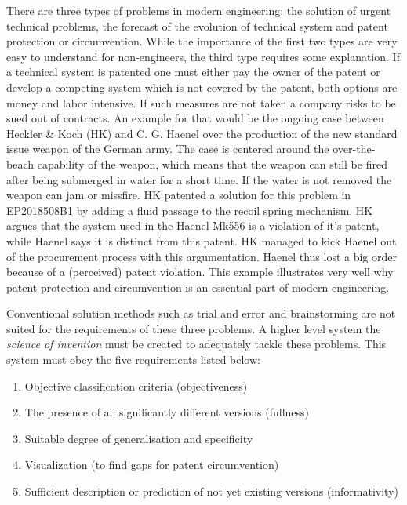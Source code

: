 \documentclass[11pt,a4paper]{article}
\begin{document}
There are three types of problems in modern engineering: the solution of urgent technical problems, the forecast of the evolution of technical system and patent protection or circumvention. While the importance of the first two types are very easy to understand for non-engineers, the third type requires some explanation. If a technical system is patented one must either pay the owner of the patent or develop a competing system which is not covered by the patent, both options are money and labor intensive. If such measures are not taken a company risks to be sued out of contracts. 
An example for that would be the ongoing case between Heckler \& Koch (HK) and C. G. Haenel over the production of the new standard issue weapon of the German army. The case is centered around the over-the-beach capability of the weapon, which means that the weapon can still be fired after being submerged in water for a short time. If the water is not removed the weapon can jam or missfire. HK patented a solution for this problem in \href{https://patents.google.com/patent/EP2018508B1/en}{EP2018508B1} by adding a fluid passage to the recoil spring mechanism. HK argues that the system used in the Haenel Mk556 is a violation of it's patent, while Haenel says it is distinct from this patent. HK managed to kick Haenel out of the procurement process with this argumentation. Haenel thus lost a big order because of a (perceived) patent violation. This example illustrates very well why patent protection and circumvention is an essential part of modern engineering.

Conventional solution methods such as trial and error and brainstorming are not suited for the requirements of these three problems. A higher level system the \textit{science of invention} must be created to adequately tackle these problems. This system must obey the five requirements listed below:

\begin{enumerate}
    \item Objective classification criteria (objectiveness)
    \item The presence of all significantly different versions (fullness)
    \item Suitable degree of generalisation and specificity
    \item Visualization (to find gaps for patent circumvention)
    \item Sufficient description or prediction of not yet existing versions (informativity)
\end{enumerate}
\end{document}
